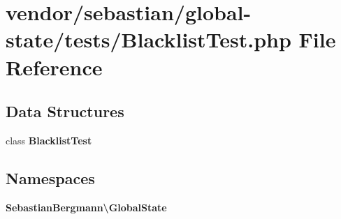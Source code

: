 \section{vendor/sebastian/global-\/state/tests/\+Blacklist\+Test.php File Reference}
\label{_blacklist_test_8php}
\subsection*{Data Structures}
\begin{DoxyCompactItemize}
\item 
class {\bf Blacklist\+Test}
\end{DoxyCompactItemize}
\subsection*{Namespaces}
\begin{DoxyCompactItemize}
\item 
 {\bf Sebastian\+Bergmann\textbackslash{}\+Global\+State}
\end{DoxyCompactItemize}
